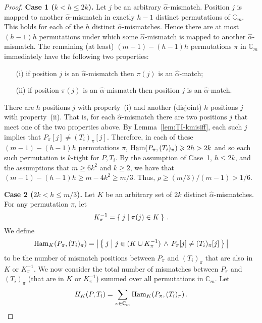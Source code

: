 \documentclass[11pt]{article}
\renewcommand{\geq}{\geqslant}
\renewcommand{\leq}{\leqslant}
\newcommand{\alphah}{\widehat{\alpha}}
\newcommand{\ham}{\ensuremath{\textup{Ham}}}
\newcommand{\Fam}{\ensuremath{\mathbb{C}_m}}
\theoremstyle{plain}
\theoremstyle{definition}
\begin{document}
\begin{proof}
    \noindent
    \textbf{Case 1 ($k < h \leq 2k$).}
    Let $j$ be an arbitrary $\alphah$-mismatch. Position $j$ is mapped to another  $\alphah$-mismatch in exactly $h-1$ distinct permutations of $\Fam$. This holds for each of the $h$ distinct $\alphah$-mismatches. Hence there are at most $(h-1)h$ permutations under which some $\alphah$-mismatch is mapped to another $\alphah$-mismatch. The remaining (at least) $(m-1)-(h-1)h$ permutations $\pi$ in $\Fam$ immediately have the following two properties:
\begin{enumerate}
        \setlength{\itemsep}{0pt}
        \item[(i)] if position $j$ is an $\alphah$-mismatch then $\pi(j)$ is an $\alphah$-match;
        \item[(ii)] if position $\pi(j)$ is an $\alphah$-mismatch then position $j$ is an $\alphah$-match.
    \end{enumerate}
There are $h$ positions $j$ with property~(i) and another (disjoint) $h$ positions $j$ with property~(ii). That is, for each $\alphah$-mismatch there are two positions $j$ that meet one of the two properties above. By Lemma~\ref{lem:TI-kmisiff}, each such $j$ implies that $P_\pi[j] \neq (T_i)_\pi[j]$. Therefore, in each of these $(m-1)-(h-1)h$ permutations $\pi$, $\ham(P_\pi,(T_i)_\pi) \geq 2h > 2k$ and so each such permutation is $k$-tight for $P,T_i$. By the assumption of Case~1, $h\leq 2k$, and the assumptions that $m \geq 6k^2$ and $k\geq 2$, we have that $(m-1)-(h-1)h \geq m - 4k^2 \geq m/3$. Thus, $\rho \geq (m/3)/(m-1) > 1/6.$
    \medskip

    \noindent
    \textbf{Case 2 ($2k < h \leq m/3$).}
    Let $K$ be an arbitrary set of $2k$ distinct $\alphah$-mismatches. For any permutation $\pi$, let
\begin{equation*}
        K_\pi^{-1}= \Set{ j | \pi(j) \in K } \,.
    \end{equation*}
We define
\begin{equation*}
        \ham_{K}(P_\pi,(T_i)_\pi) =
            \big| \Set{ j | j\in (K \cup K_\pi^{-1}) \,\wedge\, P_\pi[j] \neq (T_i)_\pi[j] } \big|
    \end{equation*}
to be the number of mismatch positions between $P_\pi$ and $(T_i)_\pi$ that are also in $K$ or $K_\pi^{-1}$. We now consider the total number of mismatches between $P_\pi$ and $(T_i)_\pi$ (that are in $K$ or $K_\pi^{-1}$) summed over all permutations in $\Fam$. Let
\begin{equation*}
        H_K(P,T_i) = \sum_{\pi \in \Fam} \ham_K(P_\pi,(T_i)_\pi) \,.
    \end{equation*}


\end{proof}
\end{document}
